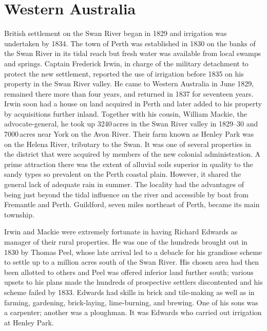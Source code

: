 \section*{Western Australia}

British settlement on the Swan River began in 1829
and irrigation was undertaken by 1834.  The town of Perth was established in 1830 on the banks of the Swan River in its
tidal reach but fresh water was available from local swamps and
springs.  Captain Frederick Irwin, in charge of the
military detachment to protect the new settlement, reported the use of
irrigation before 1835 on his property in the Swan River valley.  He
came to Western Australia in June 1829, remained there more than four
years, and returned in 1837 for seventeen years.  Irwin soon had a
house on land acquired in Perth and later added to his property by
acquisitions further inland.  Together with his cousin, William
Mackie, the advocate-general, he took up 3240\,acres
in the Swan River valley in 1829--30 and 7000\,acres near York on the
Avon River. Their farm known as Henley
Park was on the Helena
River, tributary to the Swan.  It was one of
several properties in the district that were acquired by members of
the new colonial administration.  A prime attraction there was the
extent of alluvial soils superior in quality to the sandy types so
prevalent on the Perth coastal plain.  However, it shared the general
lack of adequate rain in summer.  The locality had the advantages of
being just beyond the tidal influence on the river and accessible by
boat from Fremantle
 and Perth.  Guildford, seven miles
northeast of Perth, became its main
township.

Irwin and Mackie were extremely fortunate in having Richard
Edwards as manager of their rural properties.  He
was one of the hundreds brought out in 1830 by Thomas
Peel, whose late arrival led to a debacle for his
grandiose scheme to settle up to a million acres south of the Swan
River.  His chosen area had then been allotted to others and Peel was
offered inferior land further south; various upsets to his plans made
the hundreds of prospective settlers discontented and his scheme
failed by 1833.  Edwards had skills in brick and tile-making as well
as in farming, gardening, brick-laying, lime-burning, and brewing.
One of his sons was a carpenter; another was a ploughman.  It was
Edwards who carried out irrigation at Henley Park.

